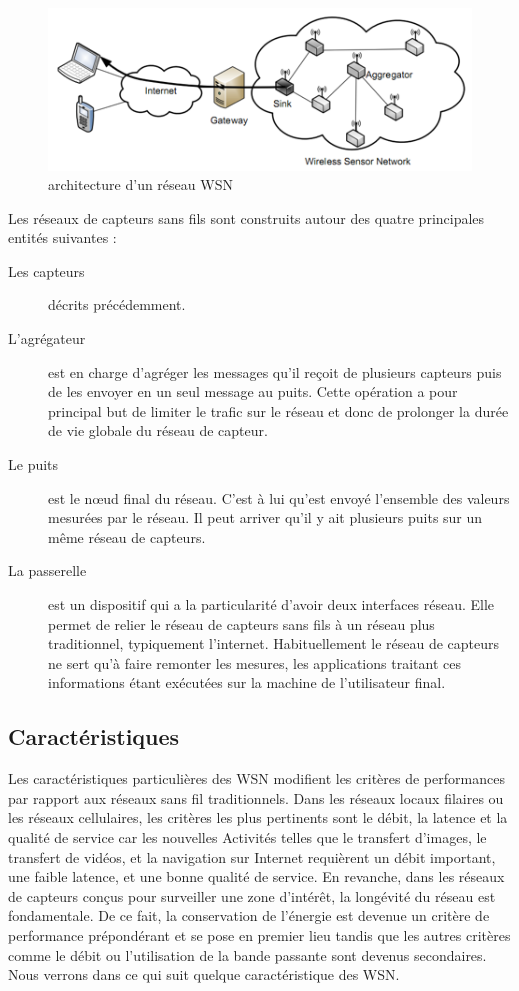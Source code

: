 \begin{figure}[h]
\centering
\includegraphics[scale=0.8]{intro/archiWSN}
\caption{\label{archiWSN} architecture d’un réseau WSN}
\end{figure}

Les réseaux de capteurs sans fils sont construits autour des quatre principales entités suivantes :

\begin{description}
\item[Les capteurs] décrits précédemment.

\item[L’agrégateur] est en charge d’agréger les messages qu’il reçoit de plusieurs capteurs puis de les envoyer en un seul message au puits. Cette opération a pour principal but de limiter le trafic sur le réseau et donc de prolonger la durée de vie globale du réseau de capteur.

\item[Le puits] est le nœud final  du réseau. C’est à lui qu’est  envoyé l’ensemble des valeurs mesurées par le réseau.  Il peut arriver qu’il y ait plusieurs puits sur un même réseau de capteurs.

\item[La passerelle] est un dispositif qui a la particularité d’avoir deux interfaces réseau. Elle permet de relier le réseau de capteurs  sans fils  à un réseau plus traditionnel, typiquement l’internet. Habituellement  le réseau de capteurs  ne sert  qu’à  faire remonter les 
mesures, les applications traitant ces informations étant exécutées sur la machine 
de l’utilisateur final.
\end{description}



\subsection{Caractéristiques}
Les caractéristiques particulières des WSN modifient les critères de performances par rapport aux réseaux sans fil traditionnels. Dans les réseaux locaux filaires ou les réseaux cellulaires, les critères les plus pertinents sont le débit, la latence et la qualité de service car les nouvelles Activités telles que le transfert d’images,  le  transfert de vidéos, et la navigation sur Internet requièrent un débit important, une faible latence, et une bonne qualité de service. En revanche, dans les réseaux de capteurs conçus pour surveiller une zone d’intérêt,  la longévité du réseau est fondamentale. De ce fait, la conservation de l’énergie est devenue un critère de performance prépondérant et se pose en premier lieu tandis que les autres critères comme le débit ou l’utilisation de la bande passante sont devenus secondaires. Nous verrons dans ce qui suit quelque caractéristique des WSN.

